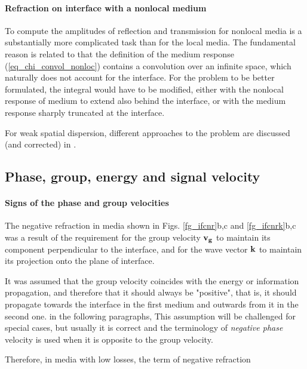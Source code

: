 \paragraph{Refraction on interface with a nonlocal medium}   %
To compute the amplitudes of reflection and transmission for nonlocal media is a substantially more complicated task than for the local media. The fundamental reason is related to that the definition of the medium response (\ref{eq_chi_convol_nonloc}) contains a convolution over an infinite space, which naturally does not account for the interface. For the problem to be better formulated, the integral would have to be modified, either with the nonlocal response of medium to extend also behind the interface, or with the medium response sharply truncated at the interface.

For weak spatial dispersion, different approaches to the problem are discussed (and corrected) in \cite{golubkov1995boundary}. %


\subsection{Phase, group, energy and signal velocity}
\label{chap_vfvg}
\paragraph{Signs of the phase and group velocities}%
The negative refraction in media shown in Figs. \ref{fg_ifcnr}b,c and \ref{fg_ifcnrk}b,c was a result of the requirement for the group velocity ${\mathbf{v_g}}$ to maintain its component perpendicular to the interface, and for the wave vector ${\mathbf{k}}$ to maintain its projection onto the plane of interface. 

It was assumed that the group velocity coincides with the energy or information propagation, and therefore that it should always be "positive", that is, it should propagate towards the interface in the first medium and outwards from it in the second one.  in the following paragraphs, This assumption will be challenged for special cases, but usually it is correct and the terminology of \textit{negative phase} velocity is used when it is opposite to the group velocity.

Therefore, in media with low losses, the term of negative refraction 


